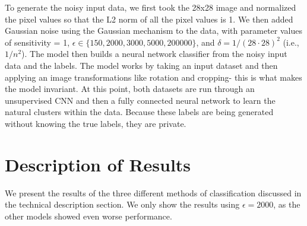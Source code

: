 \documentclass[12pt]{report}
\begin{document}
To generate the noisy input data, we first took the 28x28 image and normalized the pixel values so that the L2 norm of all the pixel values is 1. We then added Gaussian noise using the Gaussian mechanism to the data, with parameter values of sensitivity = 1, $\epsilon \in \{150, 2000, 3000, 5000, 200000\}$, and $\delta = 1/(28\cdot 28)^2$ (i.e., $1/n^2$). The model then builds a neural network classifier from the noisy input data and the labels. The model works by taking an input dataset and then applying an image transformations like rotation and cropping- this is what makes the model invariant. At this point, both datasets are run through an unsupervised CNN and then a fully connected neural network to learn the natural clusters within the data. Because these labels are being generated without knowing the true labels, they are private. 



\section{Description of Results}
We present the results of the three different methods of classification discussed in the technical description section. We only show the results using $\epsilon = 2000$, as the other models showed even worse performance. 
\end{document}
